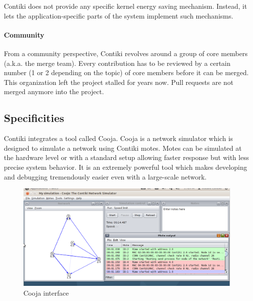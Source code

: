 Contiki does not provide any specific kernel energy saving mechanism.
Instead, it lets the application-specific parts of the system implement such mechanisms.

\paragraph{Community} From a community perspective, Contiki revolves around a group of core members (a.k.a. the merge team)\cite{contikipr}.
Every contribution has to be reviewed by a certain number (1 or 2 depending on the topic) of core members before it can be merged.
This organization left the project stalled for years now.
Pull requests are not merged anymore into the project.

\subsection{Specificities}
Contiki integrates a tool called Cooja.
Cooja is a network simulator which is designed to simulate a network using Contiki motes.
Motes can be simulated at the hardware level or with a standard setup allowing faster response but with less precise system behavior.
It is an extremely powerful tool which makes developing and debugging tremendously easier even with a large-scale network.

\begin{figure}[!h]
    \centering
    \includegraphics[scale=0.4]{assets/cooja.png}
    \caption{\label{fig:cooja}Cooja interface}
\end{figure}

